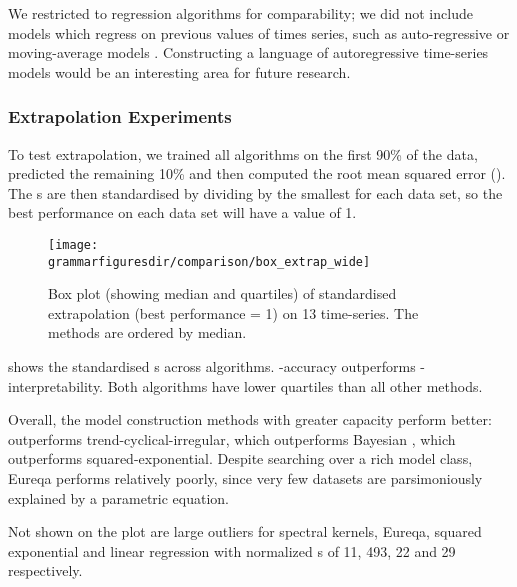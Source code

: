 We restricted to regression algorithms for comparability; we did not include models which regress on previous values of times series, such as auto-regressive or moving-average models \citep[e.g.][]{box2013time}.
Constructing a language of autoregressive time-series models would be an interesting area for future research.



\subsubsection{Extrapolation Experiments}

To test extrapolation, we trained all algorithms on the first 90\% of the data, predicted the remaining 10\% and then computed the root mean squared error (\RMSE{}).
The \RMSE{}s are then standardised by dividing by the smallest \RMSE{} for each data set, so the best performance on each data set will have a value of 1.

\begin{figure}[h!]
\texttt{[image: \\grammarfiguresdir/comparison/box\_extrap\_wide]}
\caption[Extrapolation error of all methods on 13 time-series datasets]
{Box plot (showing median and quartiles) of standardised extrapolation \RMSE{} (best performance = 1) on 13 time-series.
The methods are ordered by median.
}
\label{fig:box_extrap_dist}
\end{figure}


 shows the standardised \RMSE{}s across algorithms.
\procedurename{}-accuracy outperforms \procedurename{}-interpretability.
Both algorithms have lower quartiles than all other methods.

Overall, the model construction methods with greater capacity perform better: \procedurename{} outperforms trend-cyclical-irregular, which outperforms Bayesian \MKL{}, which outperforms squared-exponential.
Despite searching over a rich model class, Eureqa performs relatively poorly, since very few datasets are parsimoniously explained by a parametric equation.

Not shown on the plot are large outliers for spectral kernels, Eureqa, squared exponential and linear regression with normalized \RMSE{}s of 11, 493, 22 and 29 respectively.


